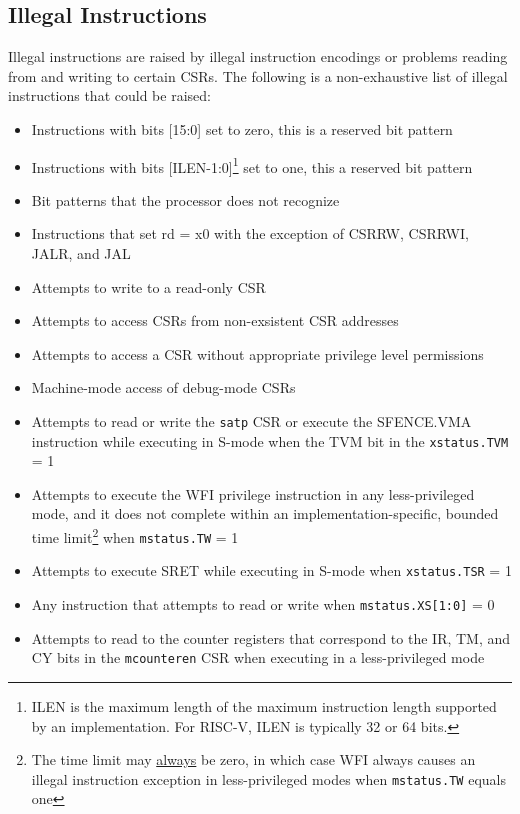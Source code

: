 \documentclass[12pt]{article}
\begin{document}
\subsection{Illegal Instructions}
Illegal instructions are raised by illegal instruction encodings or problems reading from and writing to certain CSRs. The following is a non-exhaustive list of illegal instructions that could be raised:
\begin{itemize}
    \item Instructions with bits [15:0] set to zero, this is a reserved bit pattern
    \item Instructions with bits [ILEN-1:0]\footnote[2]{ILEN is the maximum length of the maximum instruction length supported by an implementation. For RISC-V, ILEN is typically 32 or 64 bits.} set to one, this a reserved bit pattern 
    \item Bit patterns that the processor does not recognize
    \item Instructions that set rd = x0 with the exception of CSRRW, CSRRWI, JALR, and JAL
    \item Attempts to write to a read-only CSR 
    \item Attempts to access CSRs from non-exsistent CSR addresses
    \item Attempts to access a CSR without appropriate privilege level permissions 
    \item Machine-mode access of debug-mode CSRs
    \item Attempts to read or write the {\tt{satp}} CSR or execute the SFENCE.VMA instruction while executing in S-mode when the TVM bit in the {\tt{xstatus.TVM}} = 1
    \item Attempts to execute the WFI privilege instruction in any less-privileged mode, and it does not complete within an implementation-specific, bounded time limit\footnote[3]{The time limit may \underline{always} be zero, in which case WFI always causes an illegal instruction exception in less-privileged modes when {\tt{mstatus.TW}} equals one} when {\tt{mstatus.TW}} = 1
    \item Attempts to execute SRET while executing in S-mode when {\tt{xstatus.TSR}} = 1
    \item Any instruction that attempts to read or write when {\tt{mstatus.XS[1:0]}} = 0
    \item Attempts to read to the counter registers that correspond to the IR, TM, and CY bits in the {\tt{mcounteren}} CSR when executing in a less-privileged mode 
\end{itemize}
\end{document}
